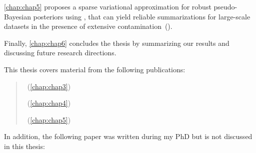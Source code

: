 \cref{chap:chap5} proposes a sparse variational approximation for robust pseudo-Bayesian posteriors using \bdiv, that can yield reliable summarizations for large-scale datasets in the presence of extensive contamination~(\bcores). 

Finally, \cref{chap:chap6} concludes the thesis by summarizing our results and discussing future research directions.


This thesis covers material from the following publications:

\begin{quote}
	~(\cref{chap:chap3})
	
	~(\cref{chap:chap4})
	
	~(\cref{chap:chap5})
\end{quote}


In addition, the following paper was written during my PhD but is not discussed in this thesis:

\begin{quote}
\end{quote}

